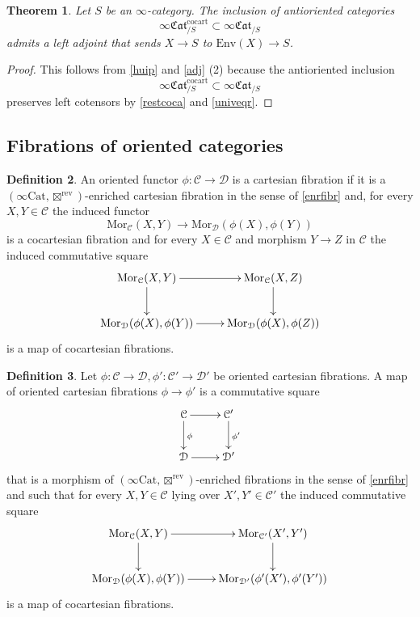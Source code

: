 \documentclass[10pt,oneside]{article}
\numberwithin{equation}{section} %
\numberwithin{figure}{section} %
\theoremstyle{plain}
\newtheorem{theorem}{Theorem}[subsection]
\theoremstyle{definition}
\newtheorem{definition}[theorem]{Definition}
\newcommand{\mC}{{\mathcal C}}
\newcommand{\mD}{{\mathcal D}}
\newcommand{\rev}{{\mathrm{rev}}}
\newcommand{\Env}{{\mathrm{Env}}}
\newcommand{\Cat}{\mathrm{Cat}}
\newcommand{\cocart}{{\mathrm{cocart}}}
\newcommand{\Mor}{{\mathrm{Mor}}}
\newcommand{\fcat}{\mathfrak{Cat}}
\begin{document}

\begin{theorem}\label{leftadjointtheorem}
Let $S$ be an $\infty$-category.
The inclusion of antioriented categories $$\infty\fcat^\cocart_{/S}\subset \infty\fcat_{/S}$$
admits a left adjoint that sends $X \to S$ 
to $\Env(X) \to S$.
\end{theorem}

\begin{proof}

This follows from \cref{huip} and \cref{adj} (2) because the antioriented inclusion $$\infty\fcat^\cocart_{/S}\subset \infty\fcat_{/S}$$ preserves left cotensors by \cref{restcoca} and \cref{univeqr}.  
\end{proof}

\subsection{Fibrations of oriented categories}

\begin{definition}
An oriented functor $\phi: \mC \to \mD$ is a cartesian fibration
if it is a $(\infty\Cat, \boxtimes^\rev)$-enriched cartesian fibration
in the sense of \cref{enrfibr} and, for every $X,Y \in \mC$
the induced functor
$$\Mor_\mC(X,Y) \to \Mor_\mD(\phi(X),\phi(Y)) $$ is a cocartesian fibration and for every $X \in \mC$ and morphism $Y \to Z $ in $\mC$ the induced commutative square
$$\begin{xy}
\xymatrix{
\Mor_\mC(X,Y) \ar[d]^{} \ar[r]
& \Mor_\mC(X,Z) \ar[d]
\\ 
\Mor_\mD(\phi(X),\phi(Y)) \ar[r] & \Mor_\mD(\phi(X),\phi(Z))}
\end{xy}$$
is a map of cocartesian fibrations. 
    
\end{definition}

\begin{definition}
Let $\phi: \mC \to \mD, \phi': \mC' \to \mD'$ be oriented cartesian fibrations.
A map of oriented cartesian fibrations $\phi \to \phi'$
is a commutative square
$$\begin{xy}
\xymatrix{
\mC \ar[d]^{\phi} \ar[r]
& \mC' \ar[d]^{\phi'}
\\ 
\mD \ar[r] & \mD'}
\end{xy}$$
that is a morphism of $(\infty\Cat, \boxtimes^\rev)$-enriched fibrations
in the sense of \cref{enrfibr} and such that for every $X,Y \in \mC$
lying over $X', Y' \in \mC' $ the induced commutative square
$$\begin{xy}
\xymatrix{
\Mor_\mC(X,Y) \ar[d]^{} \ar[r]
& \Mor_{\mC'}(X',Y') \ar[d]
\\ 
\Mor_\mD(\phi(X),\phi(Y)) \ar[r] & \Mor_{\mD'}(\phi'(X'),\phi'(Y'))}
\end{xy}$$
is a map of cocartesian fibrations. 
    
\end{definition}
\end{document}
